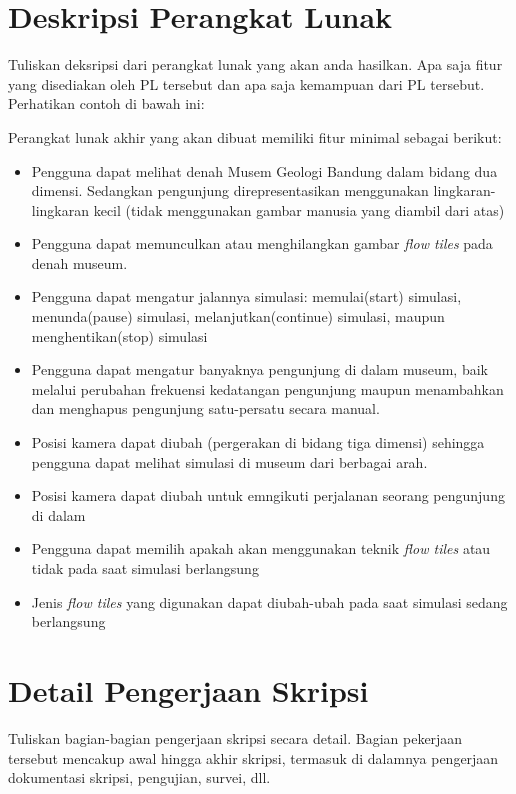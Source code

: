 \documentclass[a4paper,twoside]{article}
\begin{document}
\section{Deskripsi Perangkat Lunak}
Tuliskan deksripsi dari perangkat lunak yang akan anda hasilkan. Apa saja fitur yang disediakan oleh PL tersebut dan apa saja kemampuan dari PL tersebut. Perhatikan contoh di bawah ini:

Perangkat lunak akhir yang akan dibuat memiliki fitur minimal sebagai berikut:
\begin{itemize}
	\item Pengguna dapat melihat denah Musem Geologi Bandung dalam bidang dua dimensi. Sedangkan pengunjung direpresentasikan menggunakan lingkaran-lingkaran kecil (tidak menggunakan gambar manusia yang diambil dari atas)
	\item Pengguna dapat memunculkan atau menghilangkan gambar {\it flow tiles} pada denah museum. 
	\item Pengguna dapat mengatur jalannya simulasi: memulai(start) simulasi, menunda(pause) simulasi, melanjutkan(continue) simulasi, maupun menghentikan(stop) simulasi
	\item Pengguna dapat mengatur banyaknya pengunjung di dalam museum, baik melalui perubahan frekuensi kedatangan pengunjung maupun menambahkan dan menghapus pengunjung satu-persatu secara manual.
	\item Posisi kamera dapat diubah (pergerakan di bidang tiga dimensi) sehingga pengguna dapat melihat simulasi di museum dari berbagai arah. 
	\item Posisi kamera dapat diubah untuk emngikuti perjalanan seorang pengunjung di dalam 
	\item Pengguna dapat memilih apakah akan menggunakan teknik {\it flow tiles} atau tidak pada saat simulasi berlangsung
	\item Jenis {\it flow tiles} yang digunakan dapat diubah-ubah pada saat simulasi sedang berlangsung
		
\end{itemize}

\section{Detail Pengerjaan Skripsi}
Tuliskan bagian-bagian pengerjaan skripsi secara detail. Bagian pekerjaan tersebut mencakup awal hingga akhir skripsi, termasuk di dalamnya pengerjaan dokumentasi skripsi, pengujian, survei, dll.
\end{document}
